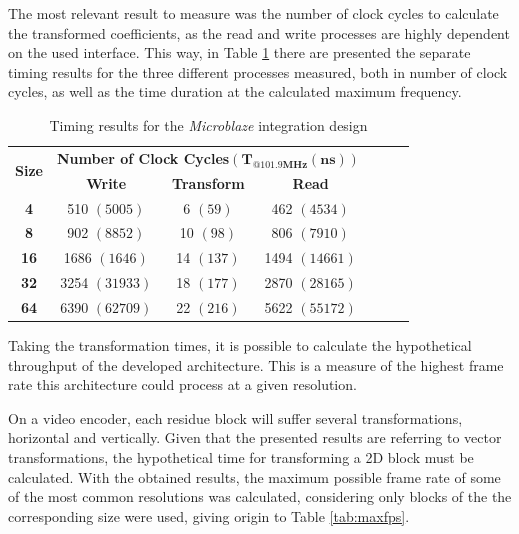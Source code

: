 The most relevant result to measure was the number of clock cycles to calculate the transformed coefficients, as the read and write processes are highly dependent on the used interface. This way, in Table \ref{tab:axi4time} there are presented the separate timing results for the three different processes measured, both in number of clock cycles, as well as the time duration at the calculated maximum frequency. 

\begin{table}[!htpb]
    \centering
    \begin{tabular}{ccccccc} \toprule
        \multirow{2}{*}{\textbf{Size}}   & \multicolumn{3}{c}{\textbf{Number of Clock Cycles}$\mathbf{(T_{@101.9MHz}(ns))}$}                      \\
                                         & \textbf{Write} & \textbf{Transform} & \textbf{Read}  \\ \toprule
        \textbf{4}                       & 510 $(5005)$   & 6 $(59)$           & 462 $(4534)$   \\
        \textbf{8}                       & 902 $(8852)$   & 10 $(98)$          & 806 $(7910)$   \\
        \textbf{16}                      & 1686 $(1646)$  & 14 $(137)$         & 1494 $(14661)$ \\
        \textbf{32}                      & 3254 $(31933)$ & 18 $(177)$         & 2870 $(28165)$ \\
        \textbf{64}                      & 6390 $(62709)$ & 22 $(216)$         & 5622 $(55172)$ \\
        \bottomrule
    \end{tabular}
    \caption{Timing results for the \emph{Microblaze} integration design}
    \label{tab:axi4time}
\end{table}

Taking the transformation times, it is possible to calculate the hypothetical throughput of the developed architecture. This is a measure of the highest frame rate this architecture could process at a given resolution. 

On a video encoder, each residue block will suffer several transformations, horizontal and vertically. Given that the presented results are referring to vector transformations, the hypothetical time for transforming a 2D block must be calculated. With the obtained results, the maximum possible frame rate of some of the most common resolutions was calculated, considering only blocks of the the corresponding size were used, giving origin to Table \ref{tab:maxfps}.

